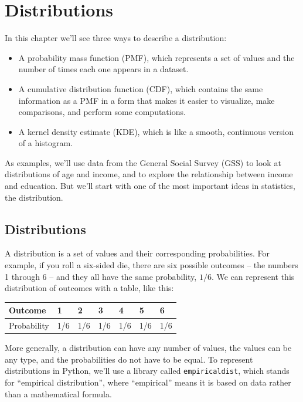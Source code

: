 \chapter{Distributions}\label{distributions}

In this chapter we'll see three ways to describe a distribution:

\begin{itemize}
\item
  A probability mass function (PMF), which represents a set of values
  and the number of times each one appears in a dataset.
\item
  A cumulative distribution function (CDF), which contains the same
  information as a PMF in a form that makes it easier to visualize, make
  comparisons, and perform some computations.
\item
  A kernel density estimate (KDE), which is like a smooth, continuous
  version of a histogram.
\end{itemize}

As examples, we'll use data from the General Social Survey (GSS) to look
at distributions of age and income, and to explore the relationship
between income and education. But we'll start with one of the most
important ideas in statistics, the distribution.

\section{Distributions}\label{distributions-1}

A distribution is a set of values and their corresponding probabilities.
For example, if you roll a six-sided die, there are six possible
outcomes -- the numbers 1 through 6 -- and they all have the same
probability, \(1/6\). We can represent this distribution of outcomes
with a table, like this:

\begin{longtable}[]{@{}lllllll@{}}
\midrule\noalign{}
Outcome & 1 & 2 & 3 & 4 & 5 & 6 \\
\midrule\noalign{}
\endhead
\midrule\noalign{}
\endlastfoot
Probability & 1/6 & 1/6 & 1/6 & 1/6 & 1/6 & 1/6 \\
\end{longtable}

More generally, a distribution can have any number of values, the values
can be any type, and the probabilities do not have to be equal. To
represent distributions in Python, we'll use a library called
\passthrough{\lstinline!empiricaldist!}, which stands for ``empirical
distribution'', where ``empirical'' means it is based on data rather
than a mathematical formula.

